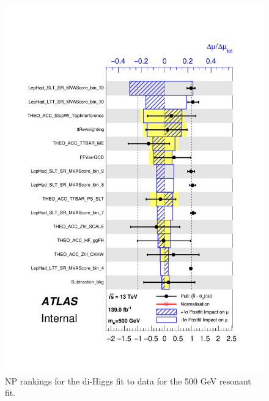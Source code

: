    \begin{figure}
   \centering
   \includegraphics[width=.8\textwidth]{figures/results/HH/LepHad/pulls_SigXsecOverSM_500.pdf}
   \caption{NP rankings for the di-Higgs \lephad fit to data for the 500 GeV resonant fit.}
   \label{fig:LepHadPostfitNPRankings2HDM500}
   \end{figure}
   
